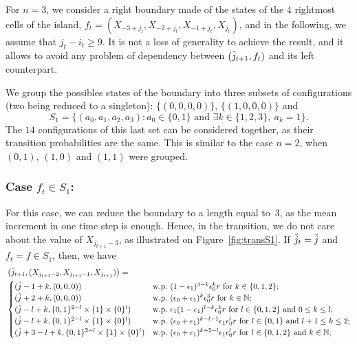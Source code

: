 \documentclass[11pt]{article}
\theoremstyle{plain}
\theoremstyle{definition}
\theoremstyle{remark}
\newcommand{\NN}{\mathbb{N}}
\begin{document}
For $n=3$, we consider a right boundary made of the states of the 4 rightmost cells of the island, $f_{t} = (X_{-3+j_t},X_{-2+j_t},X_{-1+j_t},X_{j_t})$, and 
in the following, we assume that $j_t-i_t \geq 9$. It is not a loss of generality to achieve the result, and it allows to avoid any problem of dependency between  $(\Tilde{j}_{t+1},f_t)$ and its left counterpart.

We group the possibles states of the boundary into three subsets of configurations (two being reduced to a singleton): $\{(0,0,0,0)\}$, $\{(1,0,0,0)\}$ and 
\begin{displaymath}
S_1 = \{(a_0,a_1,a_2,a_3) : a_0 \in \{0,1\} \text{ and } \exists k\in \{1,2,3\},\ a_k = 1\}.
\end{displaymath}
The $14$ configurations of this last set can be considered together, as their transition probabilities are the same. This is similar to the case $n=2$, when $(0,1)$, $(1,0)$ and $(1,1)$ were grouped.

\subsubsection{Case $f_t \in S_1$:}
For this case, we can reduce the boundary to a length equal to~$3$, as the mean increment in one time step is enough. Hence, in the transition, we do not care about the value of $X_{j_{t+1}-3}$, as illustrated on Figure~\ref{fig:transS1}. If $\Tilde{j}_t = \Tilde{j}$ and $f_t=f \in S_1$, then, we have 
\begin{align*}
    & \left(\Tilde{j}_{t+1},(X_{j_{t+1}-2},X_{j_{t+1}-1},X_{j_{t+1}}) \right) = \\
    & \begin{cases}
    (\Tilde{j}-1+k,(0,0,0)) & \text{w.p.\ } (1-\epsilon_1)^{3-k} \epsilon_0^k r \text{ for } k\in\{ 0,1,2\};\\
    (\Tilde{j}+2+k,(0,0,0)) & \text{w.p.\ } (\epsilon_0+\epsilon_1)^k \epsilon_0^3 r  \text{ for } k\in\NN;\\
    (\Tilde{j}-l+k,\{0,1\}^{2-l}\times\{1\}\times\{0\}^l) & \text{w.p.\ } \epsilon_1(1-\epsilon_1)^{l-k} \epsilon_0^k r \text{ for } l \in \{0,1,2\} \text{ and } 0\leq k\leq l;\\
    (\Tilde{j}-l+k,\{0,1\}^{2-l}\times\{1\}\times\{0\}^l) & \text{w.p.\ } (\epsilon_0+\epsilon_1)^{k-l-1} \epsilon_1 \epsilon_0^l r \text{ for } l \in \{0,1\} \text{ and } l+1\leq k\leq 2;\\
    (\Tilde{j}+3-l+k,\{0,1\}^{2-l}\times\{1\}\times\{0\}^l) & \text{w.p.\ } (\epsilon_0+\epsilon_1)^{k+2-l} \epsilon_1 \epsilon_0^l r  \text{ for } l\in \{0,1,2\} \text{ and } k\in\NN;
    \end{cases}
\end{align*}
\end{document}
